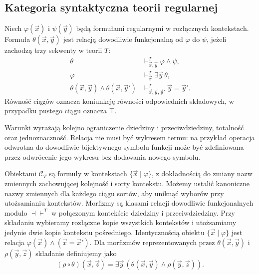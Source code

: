 \subsection{Kategoria syntaktyczna teorii regularnej}

\begin{definicja}\label{cat:def:cl-functional-relation}
Niech $\varphi(\vec x)$ i $\psi(\vec y)$ będą formułami regularnymi w rozłącznych kontekstach. Formuła $\theta(\vec x,\vec y)$ jest relacją dowodliwie funkcjonalną od $\varphi$ do $\psi$, jeżeli zachodzą trzy sekwenty w teorii $T$:
\[
\begin{aligned}
 \theta&\vdash_{\vec x,\vec y}^T\varphi\wedge\psi,\\
 \varphi&\vdash_{\vec x}^T\exists\vec y\,\theta,\\
 \theta(\vec x,\vec y)\wedge\theta(\vec x,\vec y')
 &\vdash_{\vec x,\vec y,\vec y'}^T\vec y=\vec y'.
\end{aligned}
\]
Równość ciągów oznacza koniunkcję równości odpowiednich składowych, w przypadku pustego ciągu oznacza $\top$.
\end{definicja}

Warunki wyrażają kolejno ograniczenie dziedziny i przeciwdziedziny, totalność oraz jednoznaczność. Relacja nie musi być wykresem termu: na przykład operacja odwrotna do dowodliwie bijektywnego symbolu funkcji może być zdefiniowana przez odwrócenie jego wykresu bez dodawania nowego symbolu.

\begin{definicja}\label{cat:def:cl-syntactic-category}
Obiektami $\mathcal C_T$ są formuły w kontekstach $\{\vec x\mid\varphi\}$, z dokładnością do zmiany nazw zmiennych zachowującej kolejność i sorty kontekstu. Możemy ustalić kanoniczne nazwy zmiennych dla każdego ciągu sortów, aby uniknąć wyborów przy utożsamianiu kontekstów. Morfizmy są klasami relacji dowodliwie funkcjonalnych modulo $\dashv\vdash^T$ w połączonym kontekście dziedziny i przeciwdziedziny. Przy składaniu wybieramy rozłączne kopie wszystkich kontekstów i utożsamiamy jedynie dwie kopie kontekstu pośredniego. Identycznością obiektu $\{\vec x\mid\varphi\}$ jest relacja $\varphi(\vec x)\wedge(\vec x=\vec x')$. Dla morfizmów reprezentowanych przez $\theta(\vec x,\vec y)$ i $\rho(\vec y,\vec z)$ składanie definiujemy jako
\[
 (\rho\circ\theta)(\vec x,\vec z)
 =\exists\vec y\,(\theta(\vec x,\vec y)\wedge\rho(\vec y,\vec z)).
\]
\end{definicja}

